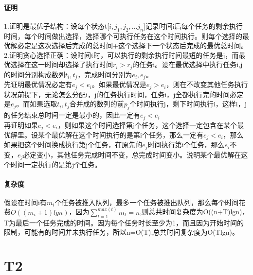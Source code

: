\documentclass{article}
\begin{document}
\begin{CJK}{UTF8}{gkai}
\paragraph{证明}
1.证明是最优子结构：设每个状态t[$i,j_{1},j_{2},...j_{n}$]记录时间i后每个任务的剩余执行时间，每个时间做出选择，选择哪个可执行任务在这个时间执行。则每个选择的最优解必定是这次选择后完成的总时间+这个选择下一个状态后完成的最优总时间。\\
2.证明贪心选择正确：设时间t时，可以执行的剩余执行时间最短的任务是j，而最优选择在这一时间却选择了执行时间$r_{i}>r_{j}$的任务i。设在最优选择中执行任务i,j的时间分别构成数列$t_{i},t_{j}$，完成时间分别为$e_{i},e_{j}$。\\
先证明最优情况必定有$e_{j}<e_{i}$。如果最优情况是$e_{j}>e_{i}$，则在不改变其他任务执行状况前提下，无论怎么分配i，j的任务执行时间，任务i，j全都执行完的时间必定是$e_{j}$。而如果选取$t_{i},t_{j}$合并成的数列的前$p_{j}$个时间执行j，剩下时间执行i，这样i，j的任务结束总时间一定是最小的，因此一定有$e_{j}<e_{i}$\\
再证明如果$e_{j}<e_{i}$，则如果这个时间选择第j个任务，这个选择一定包含在某个最优解里。设某个最优解在这个时间执行的是第i个任务，那么一定有$e_{j}<e_{i}$，那么如果把这个时间换成执行第j个任务，在原先的$e_{j}$时间执行第i个任务，那么$e_{i}$不变，$e_{j}$必定变小，其他任务完成时间不变，总完成时间变小。说明某个最优解在这个时间一定执行的是第j个任务。\\
\paragraph{复杂度}
假设在时间i有$m_{i}$个任务被推入队列，最多一个任务被推出队列，那么每个时间花费$O((m_{i}+1)lgn)$，因为$\sum_{t=1}^{max(t)}m_{t}=n$,则总共时间复杂度为O((n+T)lgn)，T为最后一个任务完成的时间。因为每个任务时长至少为1，而且因为开始时间的限制，可能有的时间并未执行任务，所以n=O(T),总共时间复杂度为O(Tlgn)。
\section{T2}


\end{CJK}
\end{document}
